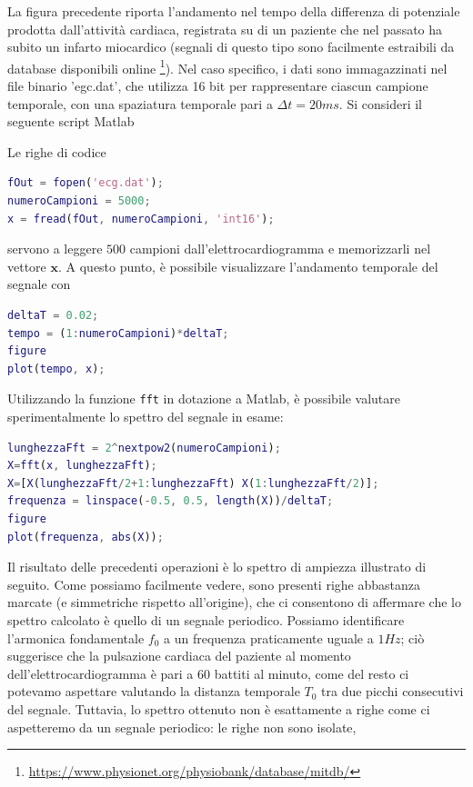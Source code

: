 \documentclass[12pt,oneside,openany]{memoir}
\numberwithin{equation}{subsection}
\begin{document}
La figura precedente riporta l'andamento nel tempo della differenza di
potenziale prodotta dall'attivit\`a cardiaca, registrata su di un paziente
che nel passato ha subito un infarto miocardico (segnali di questo tipo sono
facilmente estraibili da database disponibili online
\footnote{\href{https://www.physionet.org/physiobank/database/mitdb/}{
	https://www.physionet.org/physiobank/database/mitdb/}}).
Nel caso specifico, i dati sono immagazzinati nel file binario 'egc.dat', che
utilizza 16 bit per rappresentare ciascun campione temporale, con una spaziatura
temporale pari a $\Delta t = 20 ms$. Si consideri il seguente script Matlab

Le righe di codice
\begin{lstlisting}[frame=single, language=Matlab]
fOut = fopen('ecg.dat');
numeroCampioni = 5000;
x = fread(fOut, numeroCampioni, 'int16');
\end{lstlisting}
servono a leggere $500$ campioni dall'elettrocardiogramma e memorizzarli nel
vettore $\boldsymbol{x}$. A questo punto, \`e possibile visualizzare l'andamento
temporale del segnale con
\begin{lstlisting}[frame=single, language=Matlab]
deltaT = 0.02;
tempo = (1:numeroCampioni)*deltaT;
figure
plot(tempo, x);
\end{lstlisting}
Utilizzando la funzione \texttt{fft} in dotazione a Matlab, \`e possibile
valutare sperimentalmente lo spettro del segnale in esame:
\begin{lstlisting}[frame=single, language=Matlab]
lunghezzaFft = 2^nextpow2(numeroCampioni);
X=fft(x, lunghezzaFft);
X=[X(lunghezzaFft/2+1:lunghezzaFft) X(1:lunghezzaFft/2)];
frequenza = linspace(-0.5, 0.5, length(X))/deltaT;
figure
plot(frequenza, abs(X));
\end{lstlisting}
Il risultato delle precedenti operazioni \`e lo spettro di ampiezza illustrato
di seguito. Come possiamo facilmente vedere, sono presenti righe abbastanza
marcate (e simmetriche rispetto all'origine), che ci consentono di affermare che
lo spettro calcolato \`e quello di un segnale periodico. Possiamo identificare
l'armonica fondamentale $f_0$ a un frequenza praticamente uguale a $1 Hz$; ci\`o
suggerisce che la pulsazione cardiaca del paziente al momento
dell'elettrocardiogramma \`e pari a $60$ battiti al minuto, come del resto ci
potevamo aspettare valutando la distanza temporale $T_0$ tra due picchi
consecutivi del segnale. Tuttavia, lo spettro ottenuto non \`e esattamente a
righe come ci aspetteremo da un segnale periodico: le righe non sono isolate,
\end{document}
